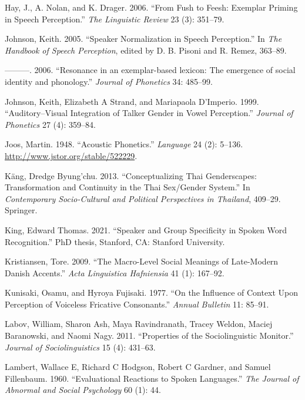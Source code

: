 \documentclass[
  letterpaper,
  DIV=11,
  numbers=noendperiod]{scrartcl}
\newlength{\cslhangindent}
\newenvironment{CSLReferences}[2] %
 {\begin{list}{}{%
  \setlength{\itemindent}{0pt}
  \setlength{\leftmargin}{0pt}
  \setlength{\parsep}{0pt}
  \ifodd #1
   \setlength{\leftmargin}{\cslhangindent}
   \setlength{\itemindent}{-1\cslhangindent}
  \fi
  \setlength{\itemsep}{#2\baselineskip}}}
 {\end{list}}
\begin{document}
\begin{CSLReferences}{1}{0}
Hay, J., A. Nolan, and K. Drager. 2006. {``From Fush to Feesh: Exemplar
Priming in Speech Perception.''} \emph{The Linguistic Review} 23 (3):
351--79.

Johnson, Keith. 2005. {``Speaker Normalization in Speech Perception.''}
In \emph{The Handbook of Speech Perception}, edited by D. B. Pisoni and
R. Remez, 363--89.

---------. 2006. {``{Resonance in an exemplar-based lexicon: The
emergence of social identity and phonology.}''} \emph{Journal of
Phonetics} 34: 485--99.

Johnson, Keith, Elizabeth A Strand, and Mariapaola D'Imperio. 1999.
{``Auditory--Visual Integration of Talker Gender in Vowel Perception.''}
\emph{Journal of Phonetics} 27 (4): 359--84.

Joos, Martin. 1948. {``Acoustic Phonetics.''} \emph{Language} 24 (2):
5--136. \url{http://www.jstor.org/stable/522229}.

Käng, Dredge Byung'chu. 2013. {``Conceptualizing Thai Genderscapes:
Transformation and Continuity in the Thai Sex/Gender System.''} In
\emph{Contemporary Socio-Cultural and Political Perspectives in
Thailand}, 409--29. Springer.

King, Edward Thomas. 2021. {``Speaker and Group Specificity in Spoken
Word Recognition.''} PhD thesis, Stanford, CA: Stanford University.

Kristiansen, Tore. 2009. {``The Macro-Level Social Meanings of
Late-Modern Danish Accents.''} \emph{Acta Linguistica Hafniensia} 41
(1): 167--92.

Kunisaki, Osamu, and Hyroya Fujisaki. 1977. {``On the Influence of
Context Upon Perception of Voiceless Fricative Consonants.''}
\emph{Annual Bulletin} 11: 85--91.

Labov, William, Sharon Ash, Maya Ravindranath, Tracey Weldon, Maciej
Baranowski, and Naomi Nagy. 2011. {``Properties of the Sociolinguistic
Monitor.''} \emph{Journal of Sociolinguistics} 15 (4): 431--63.

Lambert, Wallace E, Richard C Hodgson, Robert C Gardner, and Samuel
Fillenbaum. 1960. {``Evaluational Reactions to Spoken Languages.''}
\emph{The Journal of Abnormal and Social Psychology} 60 (1): 44.


\end{CSLReferences}
\end{document}
